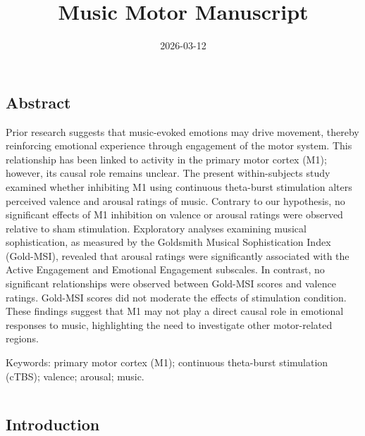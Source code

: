 \documentclass[
]{article}
\title{Music Motor Manuscript}
\author{}
\date{\vspace{-2.5em}2026-03-12}
\begin{document}
\maketitle

\subsection{Abstract}\label{abstract}

Prior research suggests that music-evoked emotions may drive movement,
thereby reinforcing emotional experience through engagement of the motor
system. This relationship has been linked to activity in the primary
motor cortex (M1); however, its causal role remains unclear. The present
within-subjects study examined whether inhibiting M1 using continuous
theta-burst stimulation alters perceived valence and arousal ratings of
music. Contrary to our hypothesis, no significant effects of M1
inhibition on valence or arousal ratings were observed relative to sham
stimulation. Exploratory analyses examining musical sophistication, as
measured by the Goldsmith Musical Sophistication Index (Gold-MSI),
revealed that arousal ratings were significantly associated with the
Active Engagement and Emotional Engagement subscales. In contrast, no
significant relationships were observed between Gold-MSI scores and
valence ratings. Gold-MSI scores did not moderate the effects of
stimulation condition. These findings suggest that M1 may not play a
direct causal role in emotional responses to music, highlighting the
need to investigate other motor-related regions.

Keywords: primary motor cortex (M1); continuous theta-burst stimulation
(cTBS); valence; arousal; music.

\begin{verbatim}
\end{verbatim}

\subsection{Introduction}\label{introduction}
\end{document}

